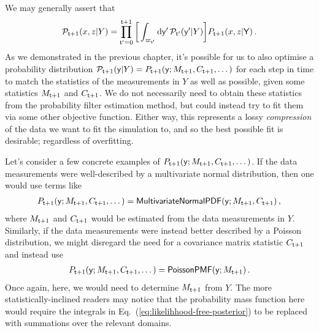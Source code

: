 We may generally assert that 
\begin{align}
{\cal P}_{{\sf t}+1}(x,z\vert Y)=\prod_{{\sf t}'=0}^{{\sf t}+1} \bigg[ \int_{\varpi_{{\sf t}'}} {\rm d}{\sf y}' \, {\cal P}_{{\sf t}'}({\sf y}'\vert Y) \bigg] P_{{\sf t}+1}(x,z \vert {\sf Y}) \label{eq:likelihhood-free-posterior} \,.
\end{align}
As we demonstrated in the previous chapter, it's possible for us to also optimise a probability distribution ${\cal P}_{{\sf t}+1}({\sf y}\vert Y) = P_{{\sf t}+1}({\sf y};M_{{\sf t}+1},C_{{\sf t}+1}, \dots)$ for each step in time to match the statistics of the measurements in $Y$ as well as possible, given some statistics $M_{{\sf t}+1}$ and $C_{{\sf t}+1}$. We do not necessarily need to obtain these statistics from the probability filter estimation method, but could instead try to fit them via some other objective function. Either way, this represents a lossy \emph{compression} of the data we want to fit the simulation to, and so the best possible fit is desirable; regardless of overfitting.

Let's consider a few concrete examples of $P_{{\sf t}+1}({\sf y};M_{{\sf t}+1},C_{{\sf t}+1}, \dots)$. If the data measurements were well-described by a multivariate normal distribution, then one would use terms like
\begin{align}
P_{{\sf t}+1}({\sf y};M_{{\sf t}+1},C_{{\sf t}+1}, \dots) = {\sf MultivariateNormalPDF}({\sf y};M_{{\sf t}+1},C_{{\sf t}+1})\,,
\end{align}
where $M_{{\sf t}+1}$ and $C_{{\sf t}+1}$ would be estimated from the data measurements in $Y$. Similarly, if the data measurements were instead better described by a Poisson distribution, we might disregard the need for a covariance matrix statistic $C_{{\sf t}+1}$ and instead use
\begin{align}
P_{{\sf t}+1}({\sf y};M_{{\sf t}+1},C_{{\sf t}+1}, \dots) = {\sf PoissonPMF}({\sf y};M_{{\sf t}+1})\,.
\end{align}
Once again, here, we would need to determine $M_{{\sf t}+1}$ from $Y$. The more statistically-inclined readers may notice that the probability mass function here would require the integrals in Eq.~(\ref{eq:likelihhood-free-posterior}) to be replaced with summations over the relevant domains.

